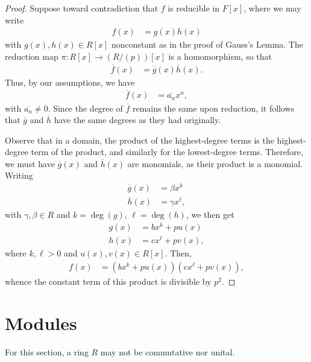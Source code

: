 \documentclass[10pt]{mypackage}
\begin{document}
\begin{proof}
  Suppose toward contradiction that $f$ is reducible in $F[x]$, where we may write
  \begin{align*}
    f(x) &= g(x)h(x)
  \end{align*}
  with $g(x),h(x)\in R[x]$ nonconstant as in the proof of Gauss's Lemma. The reduction map $\pi\colon R[x]\rightarrow \left( R/\left( p \right) \right)[x]$ is a homomorphism, so that
  \begin{align*}
    \overline{f}(x) &= \overline{g}(x) \overline{h}(x).
  \end{align*}
  Thus, by our assumptions, we have
  \begin{align*}
    \overline{f}(x) &= \overline{a_n}x^{n},
  \end{align*}
  with $ \overline{a_n}\neq \overline{0} $. Since the degree of $ \overline{f} $ remains the same upon reduction, it follows that $ \overline{g} $ and $ \overline{h} $ have the same degrees as they had originally.\newline

  Observe that in a domain, the product of the highest-degree terms is the highest-degree term of the product, and similarly for the lowest-degree terms. Therefore, we must have $ \overline{g}(x) $ and $ \overline{h}(x) $ are monomials, as their product is a monomial. Writing
  \begin{align*}
  \overline{g}(x) &= \beta x^{k}\\
  \overline{h}(x) &= \gamma x^{\ell},
  \end{align*}
  with $\gamma,\beta\in R$ and $k = \deg(g)$, $\ell = \deg(h)$, we then get
  \begin{align*}
    g(x) &= bx^{k} + p u(x)\\
    h(x) &= cx^{\ell} + p v(x),
  \end{align*}
  where $k,\ell > 0$ and $u(x),v(x)\in R[x]$. Then,
  \begin{align*}
    f(x) &= \left( bx^{k} + pu(x) \right)\left( cx^{\ell} + pv(x) \right),
  \end{align*}
  whence the constant term of this product is divisible by $p^2$.
\end{proof}
\section{Modules}%
For this section, a ring $R$ may not be commutative nor unital.
\end{document}
